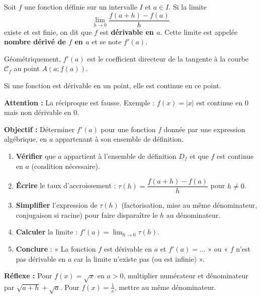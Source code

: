 \documentclass[11pt]{article}
\begin{document}
\begin{definition}
Soit $f$ une fonction définie sur un intervalle $I$ et $a \in I$. Si la limite 
\[
\lim_{h \to 0} \frac{f(a+h)-f(a)}{h}
\]
existe et est finie, on dit que $f$ est \textbf{dérivable en $a$}. Cette limite est appelée \textbf{nombre dérivé de $f$ en $a$} et se note $f'(a)$.
\par
Géométriquement, $f'(a)$ est le coefficient directeur de la tangente à la courbe $\mathcal{C}_f$ au point $A(a; f(a))$.
\end{definition}

\begin{propriete}
Si une fonction est dérivable en un point, elle est continue en ce point.
\par
\textbf{Attention :} La réciproque est fausse. Exemple : $f(x)=|x|$ est continue en $0$ mais non dérivable en $0$.
\end{propriete}

\begin{methode}
\textbf{Objectif :} Déterminer $f'(a)$ pour une fonction $f$ donnée par une expression algébrique, en $a$ appartenant à son ensemble de définition.
\begin{enumerate}
    \item \textbf{Vérifier} que $a$ appartient à l'ensemble de définition $D_f$ et que $f$ est continue en $a$ (condition nécessaire).
    \item \textbf{Écrire} le taux d'accroissement : $\tau(h) = \dfrac{f(a+h)-f(a)}{h}$ pour $h \neq 0$.
    \item \textbf{Simplifier} l'expression de $\tau(h)$ (factorisation, mise au même dénominateur, conjugaison si racine) pour faire disparaître le $h$ au dénominateur.
    \item \textbf{Calculer} la limite : $f'(a) = \lim_{h \to 0} \tau(h)$.
    \item \textbf{Conclure} : « La fonction $f$ est dérivable en $a$ et $f'(a) = \dots$ » ou « $f$ n'est pas dérivable en $a$ car la limite n'existe pas (ou est infinie) ».
\end{enumerate}
\textbf{Réflexe :} Pour $f(x)=\sqrt{x}$ en $a>0$, multiplier numérateur et dénominateur par $\sqrt{a+h}+\sqrt{a}$. Pour $f(x)=\frac{1}{x}$, mettre au même dénominateur.
\end{methode}
\end{document}
